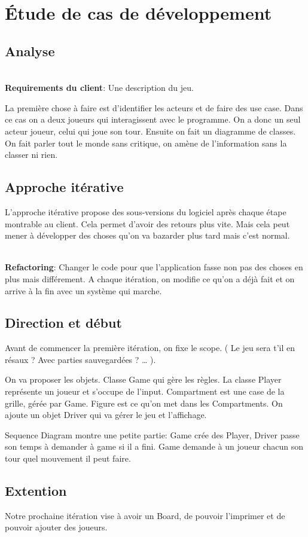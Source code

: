 \section{Étude de cas de développement}

\subsection{Analyse}
\\\textbf{Requirements du client}: Une description du jeu.

La première chose à faire est d’identifier les acteurs et de faire des use case. Dans ce cas on a deux joueurs qui interagissent avec le programme. On a donc un seul acteur joueur, celui qui joue son tour.
Ensuite on fait un diagramme de classes. On fait parler tout le monde sans critique, on amène de l’information sans la classer ni rien.

\subsection{Approche itérative}
L’approche itérative propose des sous-versions du logiciel après chaque étape montrable au client. Cela permet d’avoir des retours plus vite. Mais cela peut mener à développer des choses qu’on va bazarder plus tard mais c’est normal.

\\\textbf{Refactoring}: Changer le code pour que l’application fasse non pas des choses en plus mais différement.
A chaque itération, on modifie ce qu’on a déjà fait et on arrive à la fin avec un système qui marche.

\subsection{Direction et début}
Avant de commencer la première itération, on fixe le scope. ( Le jeu sera t’il en résaux ? Avec parties sauvegardées ? … ).

On va proposer les objets. Classe Game qui gère les règles. La classe Player représente un joueur et s’occupe de l’input. Compartment est une case de la grille, gérée par Game. Figure est ce qu’on met dans les Compartments. On ajoute un objet Driver qui va gérer le jeu et l’affichage.

Sequence Diagram montre une petite partie: Game crée des Player, Driver passe son temps à demander à game si il a fini. Game demande à un joueur chacun son tour quel mouvement il peut faire.
\subsection{Extention}
Notre prochaine itération vise à avoir un Board, de pouvoir l’imprimer et de pouvoir ajouter des joueurs.

